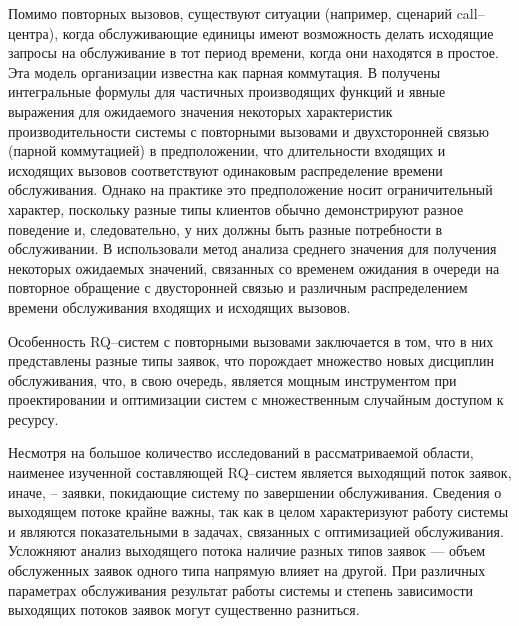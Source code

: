Помимо повторных вызовов, существуют ситуации (например, сценарий call--центра), когда обслуживающие единицы имеют возможность делать исходящие запросы на обслуживание в тот период времени, когда они находятся в простое. Эта модель организации известна как парная коммутация. В \cite{falin1979model} получены интегральные формулы для частичных производящих функций и явные выражения для ожидаемого значения некоторых характеристик производительности системы с повторными вызовами и двухсторонней связью (парной коммутацией) в предположении, что длительности входящих и исходящих вызовов соответствуют одинаковым распределение времени обслуживания. Однако на практике это предположение носит ограничительный характер, поскольку разные типы клиентов обычно демонстрируют разное поведение и, следовательно, у них должны быть разные потребности в обслуживании. В \cite{artalejo2010mean} использовали метод анализа среднего значения для получения некоторых ожидаемых значений, связанных со временем ожидания в очереди на повторное обращение с двусторонней связью и различным распределением времени обслуживания входящих и исходящих вызовов.

Особенность RQ--систем с повторными вызовами заключается в том, что в них представлены разные типы заявок, что порождает множество новых дисциплин обслуживания, что, в свою очередь, является мощным инструментом при проектировании и оптимизации систем с множественным случайным доступом к ресурсу.

Несмотря на большое количество исследований в рассматриваемой области, наименее изученной составляющей RQ--систем является выходящий поток заявок, иначе, -- заявки, покидающие систему по завершении обслуживания. Сведения о выходящем потоке крайне важны, так как в целом характеризуют работу системы и являются показательными в задачах, связанных с оптимизацией обслуживания. Усложняют анализ выходящего потока наличие разных типов заявок --- объем обслуженных заявок одного типа напрямую влияет на другой. При различных параметрах обслуживания результат работы системы и степень зависимости выходящих потоков заявок могут существенно разниться. 

